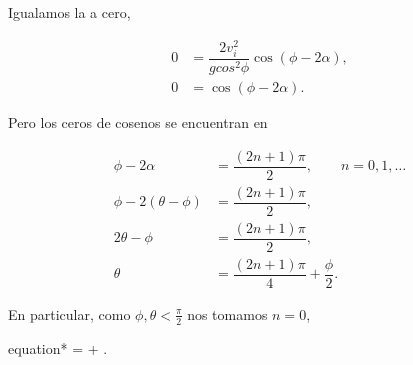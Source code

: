 \documentclass[../main.tex]{subfiles}
\begin{document}
\begin{problema}
	Igualamos la  a cero,

	\begin{align*}
		0 & = \dfrac{2v_{i}^{2}}{gcos^{2}\phi}\cos(\phi - 2\alpha), \\
		0 & = \cos(\phi - 2\alpha).
	\end{align*}

	Pero los ceros de cosenos se encuentran en

	\begin{align*}
		\phi - 2\alpha          & = \dfrac{(2n + 1)\pi}{2},\qquad n = 0,1,\dots \\
		\phi - 2(\theta - \phi) & = \dfrac{(2n + 1)\pi}{2},                     \\
		2\theta - \phi          & = \dfrac{(2n + 1)\pi}{2},                     \\
		\theta                  & = \dfrac{(2n + 1)\pi}{4} + \dfrac{\phi}{2}.
	\end{align*}

	En particular, como \(\phi, \theta < \tfrac{\pi}{2}\) nos tomamos \(n = 0\),

	\begin{empheq}[box=\mainresult]{equation*}
		\theta =  + .
	\end{empheq}
\end{problema}
\end{document}
